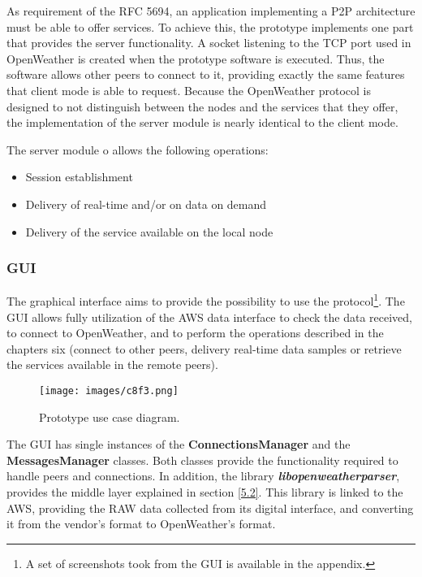As requirement of the \gls{RFC} 5694\cite{rfc5694}, an application implementing a \gls{P2P} architecture must be able to offer services. To achieve this, the prototype implements one part that provides the server functionality. A socket listening to the \gls{TCP} port used in OpenWeather is created when the prototype software is executed. Thus, the software allows other peers to connect to it, providing exactly the same features that client mode is able to request. Because the OpenWeather protocol is designed to not distinguish between the nodes and the services that they offer, the implementation of the server module is nearly identical to the client mode.

The server module o allows the following operations:

\begin{itemize}
\item Session establishment
\item Delivery of real-time and/or on data on demand
\item Delivery of the service available on the local node
\end{itemize}

\subsubsection{GUI}

The graphical interface aims to provide the possibility to use the protocol\footnote{A set of screenshots took from the GUI is available in the appendix.}. The GUI allows fully utilization of the \gls{AWS} data interface to check the data received, to connect to OpenWeather, and to perform the operations described in the chapters six (connect to other peers, delivery real-time data samples or retrieve the services available in the remote peers).

\begin{figure}[H]
\centerline{\texttt{[image: images/c8f3.png]}}
\caption{Prototype use case diagram.}
\end{figure}

The \gls{GUI} has single instances of the \textbf{ConnectionsManager} and the \textbf{MessagesManager} classes. Both classes provide the functionality required to handle peers and connections. In addition, the library \textbf{\emph{libopenweatherparser}}, provides the middle layer explained in section \ref{5.2}. This library is linked to the \gls{AWS}, providing the RAW data collected from its digital interface, and converting it from the vendor's format to OpenWeather's format.

